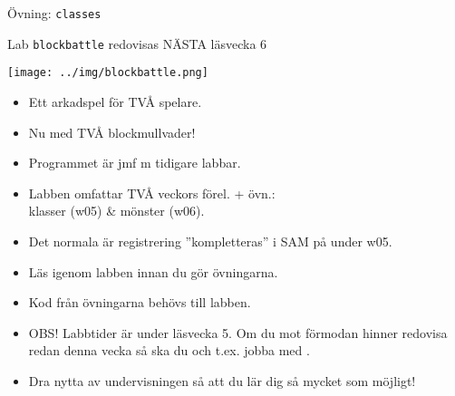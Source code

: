 

\ifkompendium\else

\begin{SlideExtra}{Övning: \texttt{classes}}
\begin{itemize}\SlideFontSmall

\end{itemize}
\end{SlideExtra}

\begin{SlideExtra}{Lab \texttt{blockbattle} redovisas NÄSTA läsvecka 6}
  \begin{minipage}{0.42\textwidth}
        \texttt{[image: ../img/blockbattle.png]}
  \end{minipage}%
  \begin{minipage}{0.59\textwidth}
    \begin{itemize}\SlideFontTiny
      \item Ett arkadspel för TVÅ spelare.
      \item Nu med TVÅ blockmullvader!
      \item Programmet  är  jmf m tidigare labbar.
      \item Labben omfattar TVÅ veckors förel. + övn.:\\klasser (w05) \& mönster (w06).
      \item Det normala är registrering ''kompletteras'' i SAM på  under w05.
      \item Läs igenom labben innan du gör övningarna.
      \item Kod från övningarna behövs till labben. 
      \item OBS! Labbtider är  under läsvecka 5. Om du mot förmodan hinner redovisa redan denna vecka så ska du  och t.ex. jobba med . 
      \item Dra nytta av undervisningen så att du lär dig så mycket som möjligt!  
    \end{itemize}    
  \end{minipage}
\end{SlideExtra}
  
\fi
